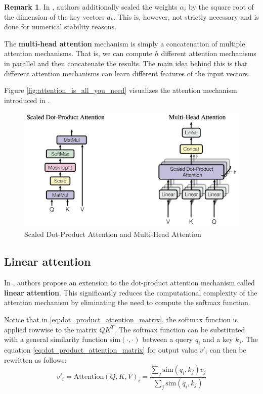 \documentclass[a4paper, twoside]{report}
\theoremstyle{definition}
\newtheorem{remark}[theorem]{Remark}
\numberwithin{equation}{section}
\begin{document}
\begin{remark}
    In \cite{1706.03762}, authors additionally scaled the weights $\alpha_i$ by the square root of the dimension of the key vectors $d_k$.
    This is, however, not strictly necessary and is done for numerical stability reasons.
\end{remark}

The \textbf{multi-head attention} mechanism is simply a concatenation of multiple attention mechanisms.
That is, we can compute $h$ different attention mechanisms in parallel and then concatenate the results.
The main idea behind this is that different attention mechanisms can learn different features of the input vectors.

Figure \ref{fig:attention_is_all_you_need} visualizes the attention mechanism introduced in \cite{1706.03762}.

\begin{figure}[h!]
    \centering
    \includegraphics[scale=0.15]{scaled_dot_product_attention.png}
    \caption{Scaled Dot-Product Attention and Multi-Head Attention \cite{1706.03762}}
    \label{fig:scaled_dot_product_attention}
\end{figure}




\subsection{Linear attention}

In \cite{2006.16236}, authors propose an extension to the dot-product attention mechanism called \textbf{linear attention}.
This significantly reduces the computational complexity of the attention mechanism by eliminating the need to compute the softmax function.

Notice that in \ref{eq:dot_product_attention_matrix}, the softmax function is applied rowwise to the matrix $Q K^T$.
The softmax function can be substituted with a general similarity function $\text{sim}(\cdot, \cdot)$ between a query $q_i$ and a key $k_j$.
The equation \ref{eq:dot_product_attention_matrix} for output value $v'_i$ can then be rewritten as follows:
\begin{equation}
    v'_i=\text{Attention}(Q, K, V)_i=\frac{\sum_j \text{sim}(q_i, k_j) v_j}{\sum_j \text{sim}(q_i, k_j)}
\end{equation}
\end{document}
